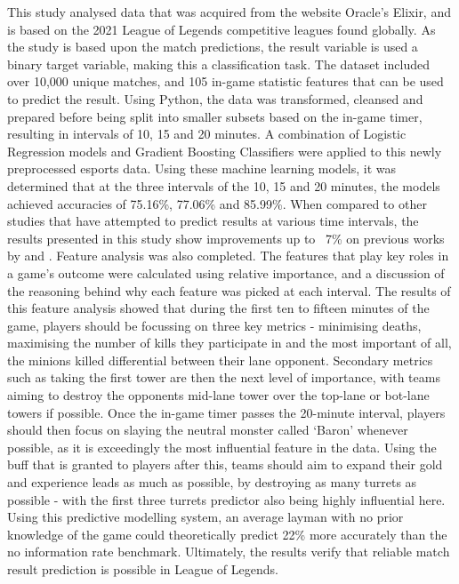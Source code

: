 This study analysed data that was acquired from the website Oracle's Elixir, and is based on the 2021 League of Legends competitive leagues found globally.
As the study is based upon the match predictions, the result variable is used a binary target variable, making this a classification task.
The dataset included over 10,000 unique matches, and 105 in-game statistic features that can be used to predict the result.
Using Python, the data was transformed, cleansed and prepared before being split into smaller subsets based on the in-game timer, resulting in intervals of 10, 15 and 20 minutes.
A combination of Logistic Regression models and Gradient Boosting Classifiers were applied to this newly preprocessed esports data.
Using these machine learning models, it was determined that at the three intervals of the 10, 15 and 20 minutes, the models achieved accuracies of 75.16\%, 77.06\% and 85.99\%.
When compared to other studies that have attempted to predict results at various time intervals, the results presented in this study show improvements up to ~7\% on previous works by \citet{lee2020predicting} and \citet{silva2018continuous}.
Feature analysis was also completed.
The features that play key roles in a game's outcome were calculated using relative importance, and a discussion of the reasoning behind why each feature was picked at each interval.
The results of this feature analysis showed that during the first ten to fifteen minutes of the game, players should be focussing on three key metrics - minimising deaths, maximising the number of kills they participate in and the most important of all, the minions killed differential between their lane opponent.
Secondary metrics such as taking the first tower are then the next level of importance, with teams aiming to destroy the opponents mid-lane tower over the top-lane or bot-lane towers if possible.
Once the in-game timer passes the 20-minute interval, players should then focus on slaying the neutral monster called `Baron' whenever possible, as it is exceedingly the most influential feature in the data.
Using the buff that is granted to players after this, teams should aim to expand their gold and experience leads as much as possible, by destroying as many turrets as possible - with the first three turrets predictor also being highly influential here.
Using this predictive modelling system, an average layman with no prior knowledge of the game could theoretically predict 22\% more accurately than the no information rate benchmark.
Ultimately, the results verify that reliable match result prediction is possible in League of Legends.

 \\



\newpage